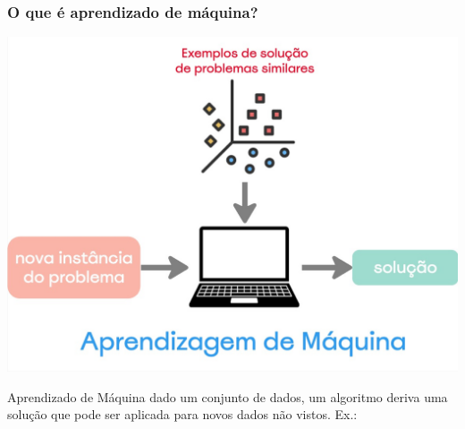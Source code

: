 \begin{frame}
    \frametitle{O que é aprendizado de máquina?}
    \begin{center}
        \includegraphics[height=0.4\paperheight]{./imgs/fig5-ml.jpg}
    \end{center}
    \begin{block}{Aprendizado de Máquina}
        dado um conjunto de dados, um algoritmo deriva uma solução que pode ser aplicada para novos dados não vistos. Ex.:
    \end{block}
\end{frame}

